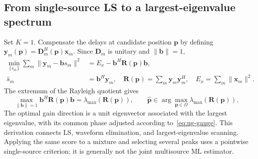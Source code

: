 \subsection{From single-source LS to a largest-eigenvalue spectrum}\label{sec:ug-single}
Set $K=1$. Compensate the delays at candidate position $\mathbf p$ by defining $\mathbf y_m(\mathbf p)=\mathbf D_m^H(\mathbf p)\mathbf x_m$. Since $\mathbf D_m$ is unitary and $\|\mathbf b\|=1$,
\begin{equation}\label{eq:ug-single-elimination}
\begin{aligned}
\min_{\{s_m\}}\sum_m\|\mathbf y_m-\mathbf b s_m\|^2
&=E_x-\mathbf b^H\mathbf R(\mathbf p)\mathbf b,\\
\widehat s_m&=\mathbf b^H\mathbf y_m,\quad
\mathbf R(\mathbf p)=\sum_m\mathbf y_m\mathbf y_m^H,\quad
E_x=\sum_m\|\mathbf x_m\|^2.
\end{aligned}
\end{equation}
The extremum of the Rayleigh quotient gives
\begin{equation}\label{eq:ug-single-eigen}
\max_{\|\mathbf b\|=1}\mathbf b^H\mathbf R(\mathbf p)\mathbf b
=\lambda_{\max}(\mathbf R(\mathbf p)),\qquad
\widehat{\mathbf p}\in\arg\max_{\mathbf p\in\Omega}
\lambda_{\max}(\mathbf R(\mathbf p)).
\end{equation}
The optimal gain direction is a unit eigenvector associated with the largest eigenvalue, with its common phase adjusted according to~\eqref{eq:ug-gauge}. This derivation connects LS, waveform elimination, and largest-eigenvalue scanning\cite{ref05,ref06}. Applying the same score to a mixture and selecting several peaks uses a pointwise single-source criterion; it is generally not the joint multisource ML estimator.


